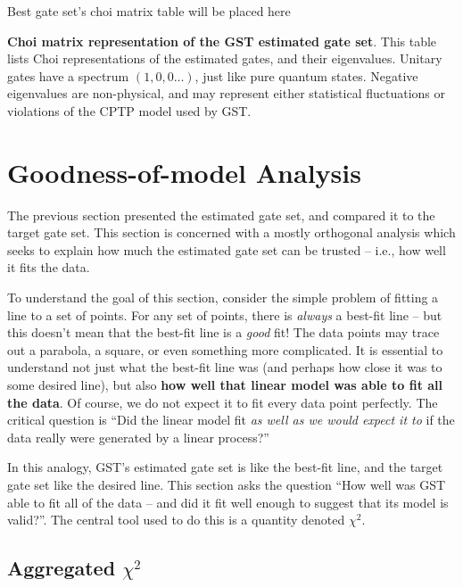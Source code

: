 \documentclass{article}[11pt]
\newcommand{\putfield}[2]{#2}
\begin{document}
\begin{table}[h]
\begin{center}
\putfield{bestGatesetChoiTable}{Best gate set's choi matrix table will be placed here}
\caption{\putfield{tt_bestGatesetChoiTable}{}\textbf{Choi matrix representation of the GST estimated gate set}.  This table lists Choi representations of the estimated gates, and their eigenvalues.  Unitary gates have a spectrum $(1,0,0\ldots)$, just like pure quantum states.  Negative eigenvalues are non-physical, and may represent either statistical fluctuations or violations of the CPTP model used by GST.\label{bestGatesetChoiTable}}
\end{center}
\end{table}



\section{Goodness-of-model Analysis\label{secGoodness}}

The previous section presented the estimated gate set, and compared it to the target gate set.  This section is concerned with a mostly orthogonal analysis which seeks to explain how much the estimated gate set can be trusted -- i.e., how well it fits the data.

To understand the goal of this section, consider the simple problem of fitting a line to a set of points.  For any set of points, there is \emph{always} a best-fit line -- but this doesn't mean that the best-fit line is a \emph{good} fit!  The data points may trace out a parabola, a square, or even something more complicated.  It is essential to understand not just what the best-fit line was (and perhaps how close it was to some desired line), but also \textbf{how well that linear model was able to fit all the data}.  Of course, we do not expect it to fit every data point perfectly.  The critical question is ``Did the linear model fit \emph{as well as we would expect it to} if the data really were generated by a linear process?''

In this analogy, GST's estimated gate set is like the best-fit line, and the target gate set like the desired line.  This section asks the question ``How well was GST able to fit all of the data -- and did it fit well enough to suggest that its model is valid?''. The central tool used to do this is a quantity denoted $\chi^2$.  

\subsection{Aggregated $\chi^2$}
\end{document}
